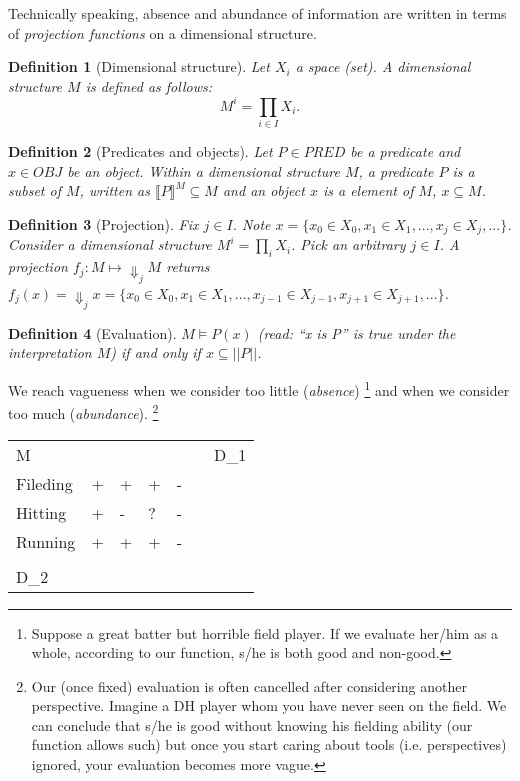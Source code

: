 \documentclass{tufte-handout}
\newtheorem{definition}{Definition}
\begin{document}
Technically speaking, absence and abundance of information are written in terms of \emph{projection functions} on a dimensional structure.

\begin{definition}[Dimensional structure]
Let $X_i$ a space (set).
A dimensional structure $M$ is defined as follows:
\[
M^{i} = \prod_{i \in I} X_i.
\]
\end{definition}

\begin{definition}[Predicates and objects]
Let $P \in PRED$ be a predicate and $x \in OBJ$ be an object.
Within a dimensional structure $M$,
a predicate $P$ is a subset of $M$, written as $\llbracket P \rrbracket^{M} \subseteq M$ and an object $x$ is a element of $M$, $x \subseteq M$.
\end{definition}

\begin{definition}[Projection]
Fix $j \in I$. Note $x = \{x_0 \in X_0, x_1 \in X_1, ... , x_j \in X_j, ...\}$.
Consider a dimensional structure $M^{i} = \prod_i X_i$.
Pick an arbitrary $j \in I$.
A projection $f_j: M \mapsto \Downarrow_j M$ returns $f_{j}(x)= \Downarrow_{j}x = \{x_0 \in X_0, x_1 \in X_1, ... , x_{j-1} \in X_{j-1}, x_{j+1} \in X_{j+1}, ...\}$.
\end{definition}

\begin{definition}[Evaluation]
$M \models P(x)$ (read: ``x is P'' is true under the interpretation $M$) if and only if $x \subseteq ||P||$.
\end{definition}

We reach vagueness when we consider too little (\emph{absence})
\footnote{Suppose a great batter but horrible field player. If we evaluate her/him as a whole, according to our function, s/he is both good and non-good.}
 and when we consider too much (\emph{abundance}).
\footnote{Our (once fixed) evaluation is often cancelled after considering another perspective. Imagine a DH player whom you have never seen on the field. We can conclude that s/he is good without knowing his fielding ability (our function allows such) but once you start caring about tools (i.e. perspectives) ignored, your evaluation becomes more vague.
}


\begin{table}
\begin{tabular}{lllllll}
M        &   &   &   &   &  & D\_1  \\
Fileding & + & + & + & - &  &       \\
Hitting  & + & - & ? & - &  &       \\
Running  & + & + & + & - &  &       \\
         &   &   &   &   &  &       \\
D\_2     &   &   &   &   &  &
\end{tabular}
\end{table}
\end{document}

